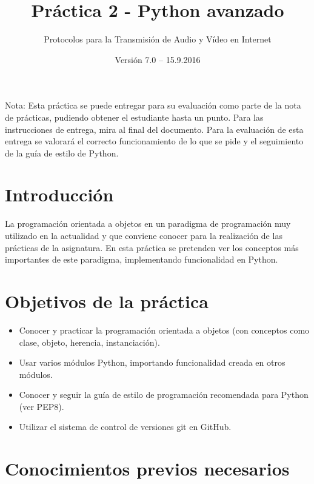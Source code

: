 \documentclass[11pt,a4paper]{article}
\begin{document}
\title{Práctica 2 - Python avanzado}
\author{Protocolos para la Transmisión de Audio y Vídeo en Internet}
\date{Versión 7.0 – 15.9.2016}


\maketitle


Nota: Esta práctica se puede entregar para su evaluación como parte de la nota de prácticas, pudiendo obtener el estudiante hasta un punto. Para las instrucciones de entrega, mira al final del documento. Para la evaluación de esta entrega se valorará el correcto funcionamiento de lo que se pide y el seguimiento de la guía de estilo de Python.

\section{Introducción}

La programación orientada a objetos en un paradigma de programación muy utilizado en la actualidad y que conviene conocer para la realización de las prácticas de la asignatura. En esta práctica se pretenden ver los conceptos más importantes de este paradigma, implementando funcionalidad en Python.


\section{Objetivos de la práctica}

\begin{itemize}
  \item Conocer y practicar la programación orientada a objetos (con conceptos como clase, objeto, herencia, instanciación).
  \item Usar varios módulos Python, importando funcionalidad creada en otros módulos.
  \item Conocer y seguir la guía de estilo de programación recomendada para Python (ver PEP8).
  \item Utilizar el sistema de control de versiones git en GitHub.
\end{itemize}

\section{Conocimientos previos necesarios}
\end{document}
